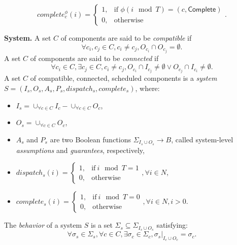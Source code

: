 \begin{equation*}
\label{eqn:complete}
    complete_c^\phi(i) =
    \begin{cases}
      1, & \text{if } \phi(i \mod T) = (c, \textsf{Complete}) \\
      0, & \text{otherwise}
    \end{cases}.
\end{equation*}

{\bf System.}
A set $C$ of components are said to be \emph{compatible} if 
\begin{equation*}
	\forall c_i,c_j \in C, c_i\neq c_j, O_{c_i} \cap O_{c_j} = \emptyset.
\end{equation*}
A set $C$ of components are said to be \emph{connected} if
\begin{equation*}
	\forall c_i \in C, \exists c_j \in C, c_i\neq c_j, O_{c_i} \cap I_{c_j} \neq \emptyset \vee O_{c_j} \cap I_{c_i} \neq \emptyset.
\end{equation*}
A set $C$ of compatible, connected, scheduled components is a \emph{system} $S = (I_s, O_s, A_s, P_s, dispatch_s, complete_s)$, where:
\begin{itemize}
	\item $I_s = \cup_{\forall c \in C}I_c -  \cup_{\forall c \in C}O_c$,
	\item $O_s = \cup_{\forall c \in C}O_c$,
	\item $A_s$ and $P_s$ are two Boolean functions $\Sigma_{I_s \cup O_s} \rightarrow B$, called system-level \emph{assumptions} and \emph{guarantees}, respectively,
	\item $dispatch_s (i) = 
	    	\begin{cases}
      		1, & \text{if}\ i \mod T =1 \\
	     	0, & \text{otherwise}
   	 	\end{cases}, \forall i \in N$,
   	\item $complete_s (i) =
   		\begin{cases}
      		1, & \text{if}\ i \mod T = 0 \\
	     	0, & \text{otherwise}
   	 	\end{cases}, \forall i \in N, i > 0$.
\end{itemize}
The \emph{behavior} of a system $S$ is a set $\Sigma_s \subseteq \Sigma_{I_s \cup O_s}$ satisfying: 
\begin{equation*}
	\forall \sigma_s \in \Sigma_s,  \forall c \in C, \exists \sigma_c \in \Sigma_c, \sigma_s|_{I_c \cup O_c} = \sigma_c.
\end{equation*}

